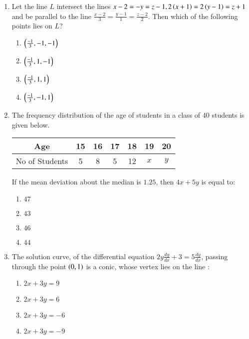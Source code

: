 \documentclass[journal,12pt,onecolumn]{IEEEtran}
\theoremstyle{remark}
\begin{document}
\begin{enumerate}
\begin{enumerate}
     \end{enumerate}
\item Let the line $L$ intersect the lines $x-2=-y=z-1,2\left(x+1\right)=2\left(y-1\right)=z+1$ and be parallel to the line $\frac{x-2}{3}=\frac{y-1}{1}=\frac{z-2}{2}$. Then which of the following points lies on $L$?
     \begin{enumerate}
	\item $\left(\frac{-1}{3},-1,-1\right)$
	\item $\left(\frac{-1}{3},1,-1\right)$
	\item $\left(\frac{-1}{3},1,1\right)$ 
	\item $\left(\frac{-1}{3},-1,1\right)$ 
     \end{enumerate}
\item The frequency distribution of the age of students in a class of $40$ students is given below.
\begin{table}[h]
\centering
\begin{tabular}{|c|c|c|c|c|c|c|}
\hline
Age           & 15  & 16  & 17  & 18  & 19  & 20  \\ \hline
No of Students & 5   & 8   & 5   & 12  & $x$ & $y$ \\ \hline
\end{tabular}
\end{table}
If the mean deviation about the median is $1.25$, then $4x+5y$ is equal to:
     \begin{enumerate}
     \item $47$ \item $43$ \item $46$ \item $44$
     \end{enumerate}
\item The solution curve, of the differential equation $2y \frac{dy}{dx} +3=5\frac{dy}{dx}$, passing through the point $\left(0,1\right)$ is a conic, whose vertex lies on the line :
	\begin{enumerate}
     \item $2x+3y=9$ \item $2x+3y=6$ \item $2x+3y=-6$ \item $2x+3y=-9$ 
     \end{enumerate}

\end{enumerate}
\end{document}
